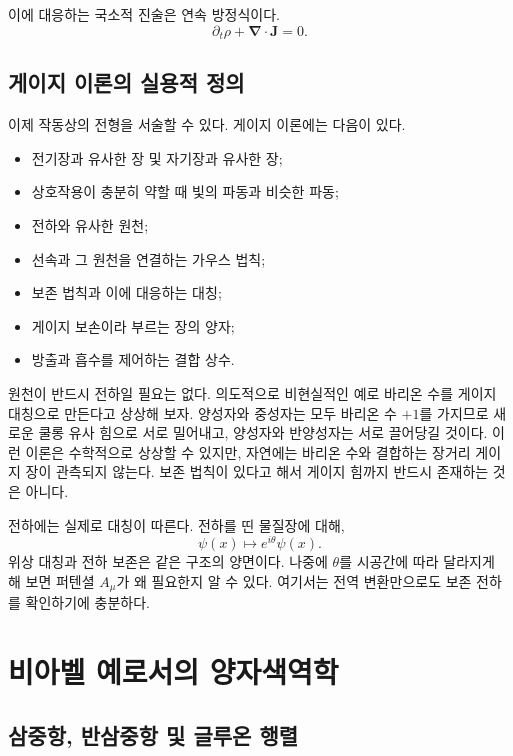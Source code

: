 이에 대응하는 국소적 진술은 연속 방정식이다.
\begin{equation}
\partial_t\rho+\boldsymbol\nabla\cdot\boldsymbol J=0.
\label{eq:l5-continuity}
\end{equation}

\subsection{게이지 이론의 실용적 정의}

이제 작동상의 전형을 서술할 수 있다. 게이지 이론에는 다음이 있다.
\begin{itemize}\item 전기장과 유사한 장 및 자기장과 유사한 장;
\item 상호작용이 충분히 약할 때 빛의 파동과 비슷한 파동;
\item 전하와 유사한 원천;
\item 선속과 그 원천을 연결하는 가우스 법칙;
\item 보존 법칙과 이에 대응하는 대칭;
\item 게이지 보손이라 부르는 장의 양자;
\item 방출과 흡수를 제어하는 결합 상수.
\end{itemize}
원천이 반드시 전하일 필요는 없다. 의도적으로 비현실적인 예로 바리온 수를 게이지 대칭으로 만든다고 상상해 보자. 양성자와 중성자는 모두 바리온 수 \(+1\)를 가지므로 새로운 쿨롱 유사 힘으로 서로 밀어내고, 양성자와 반양성자는 서로 끌어당길 것이다. 이런 이론은 수학적으로 상상할 수 있지만, 자연에는 바리온 수와 결합하는 장거리 게이지 장이 관측되지 않는다. 보존 법칙이 있다고 해서 게이지 힘까지 반드시 존재하는 것은 아니다.

전하에는 실제로 대칭이 따른다. 전하를 띤 물질장에 대해,
\begin{equation}
\psi(x)\longmapsto e^{i\theta}\psi(x).
\label{eq:l5-u1}
\end{equation}
위상 대칭과 전하 보존은 같은 구조의 양면이다. 나중에 \(\theta\)를 시공간에 따라 달라지게 해 보면 퍼텐셜 \(A_\mu\)가 왜 필요한지 알 수 있다. 여기서는 전역 변환만으로도 보존 전하를 확인하기에 충분하다.

\section{비아벨 예로서의 양자색역학}

\subsection{삼중항, 반삼중항 및 글루온 행렬}


